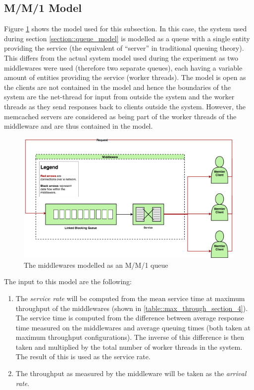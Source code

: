 \documentclass[11pt,a4paper]{article}
\begin{document}
\subsection{M/M/1 Model}
Figure \ref{png::mm1_queue} shows the model used for this subsection. In this case, the system used during section \ref{section::queue_model} is modelled as a queue with a single entity providing the service (the equivalent of ``server'' in traditional queuing theory). This differs from the actual system model used during the experiment as two middlewares were used (therefore two separate queues), each having a variable amount of entities providing the service (worker threads). The model is open as the clients are not contained in the model and hence the boundaries of the system are the net-thread for input from outside the system and the worker threads as they send responses back to clients outside the system. However, the memcached servers are considered as being part of the worker threads of the middleware and are thus contained in the model.

\begin{figure}[!h]
    \centering
    \includegraphics[width=\textwidth]{processing/graphics/mm1_queue.png}
    \caption{The middlewares modelled as an M/M/1 queue}
    \label{png::mm1_queue}
\end{figure}

The input to this model are the following:
\begin{enumerate}
    \item The \textit{service rate} will be computed from the mean service time at maximum throughput of the middlewares (shown in \ref{table::max_through_section_4}). The service time is computed from the difference between average response time measured on the middlewares and average queuing times (both taken at maximum throughput configurations). The inverse of this difference is then taken and multiplied by the total number of worker threads in the system. The result of this is used as the service rate.
    \item The throughput as measured by the middleware will be taken as the \textit{arrival rate}.
\end{enumerate}
\end{document}
